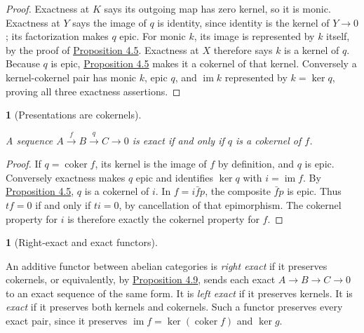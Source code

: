\documentclass[11pt,a4paper]{article}
\newcommand{\mathheading}{}
\theoremstyle{plain}
\newtheorem*{plainstatement}{\mathheading}
\theoremstyle{definition}
\newtheorem*{definitionstatement}{\mathheading}
\newenvironment{mathstatement}[3]{\renewcommand{\mathheading}{#1 #2}\begin{plainstatement}[#3]}{\end{plainstatement}}
\newenvironment{mathdefinition}[3]{\renewcommand{\mathheading}{#1 #2}\begin{definitionstatement}[#3]}{\end{definitionstatement}}
\begin{document}
\begin{proof}

Exactness at \(K\) says its outgoing map has zero kernel, so it is monic. Exactness at \(Y\) says the image of \(q\) is identity, since identity is the kernel of \(Y\to0\); its factorization makes \(q\) epic. For monic \(k\), its image is represented by \(k\) itself, by the proof of \hyperref[env-4-5]{Proposition 4.5}. Exactness at \(X\) therefore says \(k\) is a kernel of \(q\). Because \(q\) is epic, \hyperref[env-4-5]{Proposition 4.5} makes it a cokernel of that kernel. Conversely a kernel-cokernel pair has monic \(k\), epic \(q\), and \(\operatorname{im}k\) represented by \(k=\ker q\), proving all three exactness assertions.


\end{proof}
 
\begin{mathstatement}{Proposition}{4.9}{Presentations are cokernels}
\label{env-4-9}

A sequence \(A\xrightarrow{f}B\xrightarrow{q}C\to0\) is exact if and only if \(q\) is a cokernel of \(f\).


\par{}\par

\end{mathstatement}
 
\begin{proof}

If \(q=\operatorname{coker}f\), its kernel is the image of \(f\) by definition, and \(q\) is epic. Conversely exactness makes \(q\) epic and identifies \(\ker q\) with \(i=\operatorname{im}f\). By \hyperref[env-4-5]{Proposition 4.5}, \(q\) is a cokernel of \(i\). In \(f=i\bar f p\), the composite \(\bar f p\) is epic. Thus \(tf=0\) if and only if \(ti=0\), by cancellation of that epimorphism. The cokernel property for \(i\) is therefore exactly the cokernel property for \(f\).


\end{proof}
 
\begin{mathdefinition}{Definition}{4.10}{Right-exact and exact functors}
\label{env-4-10}

An additive functor between abelian categories is \emph{right exact} if it preserves cokernels, or equivalently, by \hyperref[env-4-9]{Proposition 4.9}, sends each exact \(A\to B\to C\to0\) to an exact sequence of the same form. It is \emph{left exact} if it preserves kernels. It is \emph{exact} if it preserves both kernels and cokernels. Such a functor preserves every exact pair, since it preserves \(\operatorname{im}f=\ker(\operatorname{coker}f)\) and \(\ker g\).


\par{}\par

\end{mathdefinition}
 
\end{document}
